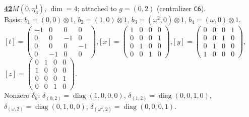 \begin{samepage}\noindent\textbf{\underline{42}}\quad $M(0,\eta^{1}_{3})$, $\dim=4$; attached to $g=(0,2)$ (centralizer \texttt{C6}).\\
Basis: $b_{1}=(0,0)\otimes 1$, $b_{2}=(1,0)\otimes 1$, $b_{3}=(\omega^2,0)\otimes 1$, $b_{4}=(\omega,0)\otimes 1$.\\
$[t]=\left(\begin{smallmatrix} -1 & 0 & 0 & 0 \\ 0 & 0 & -1 & 0 \\ 0 & 0 & 0 & -1 \\ 0 & -1 & 0 & 0 \end{smallmatrix}\right)$,\quad $[x]=\left(\begin{smallmatrix} 1 & 0 & 0 & 0 \\ 0 & 0 & 0 & 1 \\ 0 & 1 & 0 & 0 \\ 0 & 0 & 1 & 0 \end{smallmatrix}\right)$,\quad $[y]=\left(\begin{smallmatrix} 0 & 0 & 0 & 1 \\ 0 & 0 & 1 & 0 \\ 0 & 1 & 0 & 0 \\ 1 & 0 & 0 & 0 \end{smallmatrix}\right)$,\quad $[z]=\left(\begin{smallmatrix} 0 & 1 & 0 & 0 \\ 1 & 0 & 0 & 0 \\ 0 & 0 & 0 & 1 \\ 0 & 0 & 1 & 0 \end{smallmatrix}\right)$.\\
Nonzero $\delta_h$: $\delta_{(0,2)}=\operatorname{diag}(1,0,0,0)$, $\delta_{(1,2)}=\operatorname{diag}(0,0,1,0)$, $\delta_{(\omega,2)}=\operatorname{diag}(0,1,0,0)$, $\delta_{(\omega^2,2)}=\operatorname{diag}(0,0,0,1)$.\end{samepage}
\medskip

